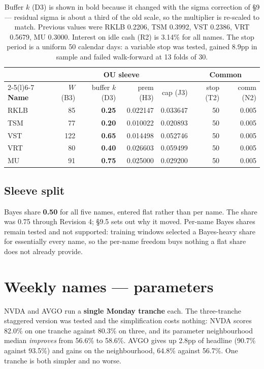 \documentclass[11pt]{article}
\begin{document}
\begin{table}[H]\centering\footnotesize
\setlength{\tabcolsep}{5pt}
\begin{tabular}{lrrrrrr}
\toprule
& \multicolumn{4}{c}{\textbf{OU sleeve}} & \multicolumn{2}{c}{\textbf{Common}}\\
\cmidrule(lr){2-5}\cmidrule(l){6-7}
\textbf{Name} & $W$ (B3) & buffer $k$ (D3) & prem (H3) & cap (J3) & stop (T2) & comm (N2)\\
\midrule
\rowcolor{bckeep} RKLB & 85  & \textbf{0.25} & 0.022147 & 0.033647 & 50 & 0.005\\
TSM  & 77  & \textbf{0.20} & 0.010022 & 0.020893 & 50 & 0.005\\
\rowcolor{bckeep} VST  & 122 & \textbf{0.65} & 0.014498 & 0.052746 & 50 & 0.005\\
VRT  & 80  & \textbf{0.40} & 0.026603 & 0.059499 & 50 & 0.005\\
\rowcolor{bckeep} MU   & 91  & \textbf{0.75} & 0.025000 & 0.029200 & 50 & 0.005\\
\bottomrule
\end{tabular}
\caption{Buffer $k$ (D3) is shown in bold because it changed with the sigma correction of
\S9 --- residual sigma is about a third of the old scale, so the multiplier is re-scaled to match.
Previous values were RKLB 0.2206, TSM 0.3992, VST 0.2386, VRT 0.5679, MU 0.3000. Interest on idle
cash (R2) is 3.14\% for all names. The stop period is a uniform 50
calendar days: a variable stop was tested, gained 8.9pp in sample and failed walk-forward at
13 folds of 30.}
\end{table}

\subsection{Sleeve split}

Bayes share \textbf{0.50} for all five names, entered flat rather than per name. The share was
0.75 through Revision 4; \S9.5 sets out why it moved. Per-name Bayes shares remain tested and not
supported: training windows selected a Bayes-heavy share for essentially every name, so the
per-name freedom buys nothing a flat share does not already provide.

\section{Weekly names --- parameters}

NVDA and AVGO run a \textbf{single Monday tranche} each. The three-tranche staggered version was
tested and the simplification costs nothing: NVDA scores 82.0\% on one tranche against 80.3\% on
three, and its parameter neighbourhood median \emph{improves} from 56.6\% to 58.6\%. AVGO gives
up 2.8pp of headline (90.7\% against 93.5\%) and gains on the neighbourhood, 64.8\% against
56.7\%. One tranche is both simpler and no worse.
\end{document}
